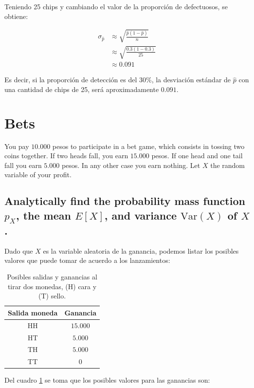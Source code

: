 \documentclass[12pt]{article}\usepackage[]{graphicx}\usepackage[]{xcolor}
\begin{document}
Teniendo 25 chips y cambiando el valor de la proporción de defectuosos, se obtiene:

\begin{align*}
  \sigma_{\hat{p}} &\approx \sqrt{\frac{\hat{p}(1 - \hat{p}) }{n}} \\
                   &\approx   \sqrt{\frac{0.3(1 - 0.3) }{25}} \\
  &\approx 0.091
\end{align*}

Es decir, si la proporción de detección es del 30\%, la desviación estándar de $\hat{p}$ con una cantidad de chips de 25, será aproximadamente $0.091$.

\section{Bets}

You pay $10.000$ pesos to participate in a bet game, which consists in tossing two coins together. If two heads fall, you earn $15.000$ pesos. If one head and one tail fall you earn $5.000$ pesos. In any other case you earn nothing. Let $X$ the random variable of your profit.

\subsection{Analytically find the probability mass function $p_{X}$, the mean $E[X]$, and variance $\mathrm{Var}(X)$ of $X$.}

Dado que $X$ es la variable aleatoria de la ganancia, podemos listar los posibles valores que puede tomar de acuerdo a los lanzamientos:

\begin{table}[ht]
  \centering
  \begin{tabular}[h]{|c|c|}
    \hline
    \textbf{Salida moneda} & \textbf{Ganancia} \\ \hline
    HH & $15.000$ \\ \hline
    HT & $5.000$ \\ \hline
    TH & $5.000$ \\ \hline
    TT & $0$ \\ \hline 
  \end{tabular}
  \caption{Posibles salidas y ganancias al tirar dos monedas, (H) cara y (T) sello.}
  \label{tab:p3}
\end{table}

Del cuadro \ref{tab:p3} se toma que los posibles valores para las ganancias son:
\end{document}
